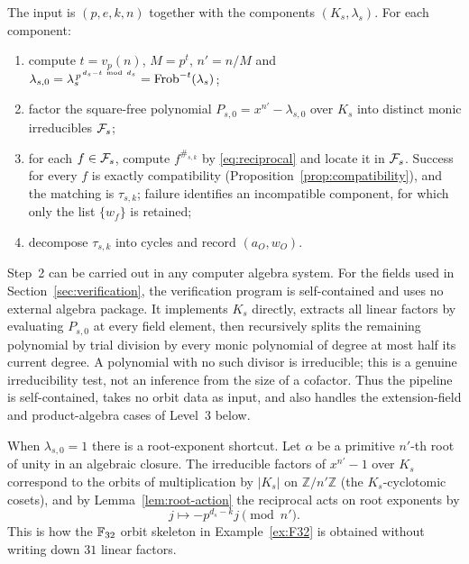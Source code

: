 The input is $(p,e,k,n)$ together with the components $(K_s,\lambda_s)$.
For each component:
\begin{enumerate}
\item compute $t=v_p(n)$, $M=p^t$, $n'=n/M$ and
  $\lambda_{s,0}=\lambda_s^{\,p^{\,d_s-t\ \mathrm{mod}\ d_s}}=\Frob^{-t}(\lambda_s)$;
\item factor the square-free polynomial $P_{s,0}=x^{n'}-\lambda_{s,0}$ over
  $K_s$ into distinct monic irreducibles $\mathcal F_s$;
\item for each $f\in\mathcal F_s$, compute $f^{\#_{s,k}}$ by \eqref{eq:reciprocal} and
  locate it in $\mathcal F_s$.  Success for every $f$ is exactly compatibility
  (Proposition~\ref{prop:compatibility}), and the matching is $\tau_{s,k}$;
  failure identifies an incompatible component, for which only the list
  $\{w_f\}$ is retained;
\item decompose $\tau_{s,k}$ into cycles and record $(a_O,w_O)$.
\end{enumerate}
Step~2 can be carried out in any computer algebra system. For the fields used
in Section~\ref{sec:verification}, the verification program is self-contained
and uses no external algebra package.  It implements $K_s$ directly,
extracts all linear factors by evaluating $P_{s,0}$ at every field element,
then recursively splits the remaining polynomial by trial division by every
monic polynomial of degree at most half its current degree.  A polynomial with
no such divisor is irreducible; this is a genuine irreducibility test, not an
inference from the size of a cofactor.  Thus the pipeline is self-contained,
takes no orbit data as input, and also handles the extension-field and
product-algebra cases of Level~3 below.

When $\lambda_{s,0}=1$ there is a root-exponent shortcut.  Let $\alpha$ be a
primitive $n'$-th root of unity in an algebraic closure.  The irreducible
factors of $x^{n'}-1$ over $K_s$ correspond to the orbits of multiplication by
$|K_s|$ on $\mathbb{Z}/n'\mathbb{Z}$ (the $K_s$-cyclotomic cosets), and by
Lemma~\ref{lem:root-action} the reciprocal acts on root exponents by
\begin{equation}\label{eq:root-exponents}
j\longmapsto -p^{d_s-k}j\pmod{n'}.
\end{equation}
This is how the $\mathbb F_{32}$ orbit skeleton in Example~\ref{ex:F32} is obtained
without writing down $31$ linear factors.
